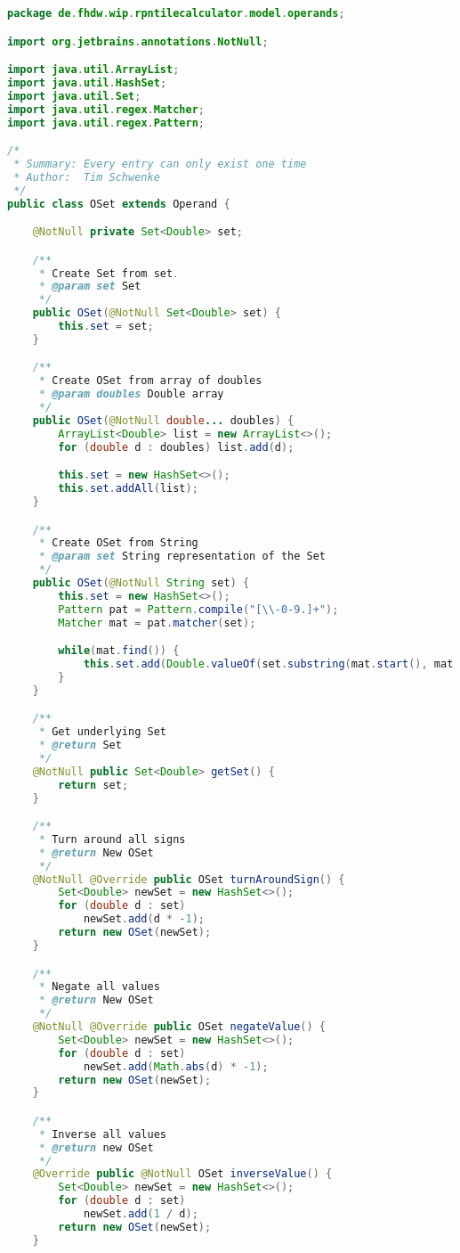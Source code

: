 \begin{lstlisting}[caption=OSet (Schwenke),label=list:OSet,language=Java]
package de.fhdw.wip.rpntilecalculator.model.operands;

import org.jetbrains.annotations.NotNull;

import java.util.ArrayList;
import java.util.HashSet;
import java.util.Set;
import java.util.regex.Matcher;
import java.util.regex.Pattern;

/*
 * Summary: Every entry can only exist one time
 * Author:  Tim Schwenke
 */
public class OSet extends Operand {

    @NotNull private Set<Double> set;

    /**
     * Create Set from set.
     * @param set Set
     */
    public OSet(@NotNull Set<Double> set) {
        this.set = set;
    }

    /**
     * Create OSet from array of doubles
     * @param doubles Double array
     */
    public OSet(@NotNull double... doubles) {
        ArrayList<Double> list = new ArrayList<>();
        for (double d : doubles) list.add(d);

        this.set = new HashSet<>();
        this.set.addAll(list);
    }

    /**
     * Create OSet from String
     * @param set String representation of the Set
     */
    public OSet(@NotNull String set) {
        this.set = new HashSet<>();
        Pattern pat = Pattern.compile("[\\-0-9.]+");
        Matcher mat = pat.matcher(set);

        while(mat.find()) {
            this.set.add(Double.valueOf(set.substring(mat.start(), mat.end())));
        }
    }

    /**
     * Get underlying Set
     * @return Set
     */
    @NotNull public Set<Double> getSet() {
        return set;
    }

    /**
     * Turn around all signs
     * @return New OSet
     */
    @NotNull @Override public OSet turnAroundSign() {
        Set<Double> newSet = new HashSet<>();
        for (double d : set)
            newSet.add(d * -1);
        return new OSet(newSet);
    }

    /**
     * Negate all values
     * @return New OSet
     */
    @NotNull @Override public OSet negateValue() {
        Set<Double> newSet = new HashSet<>();
        for (double d : set)
            newSet.add(Math.abs(d) * -1);
        return new OSet(newSet);
    }

    /**
     * Inverse all values
     * @return new OSet
     */
    @Override public @NotNull OSet inverseValue() {
        Set<Double> newSet = new HashSet<>();
        for (double d : set)
            newSet.add(1 / d);
        return new OSet(newSet);
    }


\end{lstlisting}
